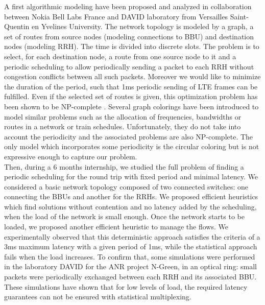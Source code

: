 \documentclass{article}
\begin{document}
A first algorithmic modeling have been proposed and analyzed in collaboration between Nokia Bell Labs France and DAVID laboratory from Versailles Saint-Quentin en Yvelines University. The network topology is modeled by a graph, a set of routes from source nodes (modeling connections to BBU) and destination nodes (modeling RRH). The time is divided into discrete slots. The problem is to select, for each destination node, a route from one source node to it and a periodic scheduling to allow periodically sending a packet to each RRH without congestion conflicts between all such packets. Moreover we would like to minimize the duration of the period, such that 1ms periodic sending of LTE frames can be fulfilled. Even if the selected set of routes is given, this optimization problem has been shown to be NP-complete \cite{rapportstage}. Several graph colorings have been introduced to model similar problems such as the allocation of frequencies\cite{borndorfer1998frequency},  bandwidths\cite{erlebach2001complexity} or routes\cite{cole1996benefit} in a network or train schedules\cite{strotmann2007railway}. Unfortunately, they do not take into account the periodicity and the associated problems are also NP-complete. The only model which incorporates some periodicity is the circular coloring\cite{zhu2006recent,zhou2013multiple,zhu2001circular} but is not expressive enough to capture our problem.\\

Then, during a 6 months internship, we studied the full problem of finding a periodic scheduling for the round trip with fixed period and minimal latency. We considered a basic network topology composed of two connected switches: one connecting the BBUs and another for the RRHs. We proposed efficient heuristics which find solutions without contention and no latency added by the scheduling, when the load of the network is small enough. Once the network starts to be loaded, we proposed another efficient heuristic to manage the flows. We experimentally observed that this deterministic approach satisfies the criteria of a 3ms maximum latency with a given period of 1ms, while the statistical approach fails when the load increases. To confirm that, some simulations were performed in the laboratory DAVID for the ANR project N-Green, in an optical ring: small packets were periodically exchanged between each RRH and its associated BBU. These simulations have shown that for low levels of load, the required latency guarantees can not be ensured with statistical multiplexing.\\
\end{document}
